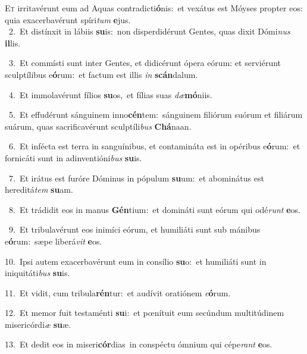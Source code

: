 \lettrine{\initial\textcolor{\initialcolor}{E}}{t} irritavérunt eum ad Aquas contradicti\-\textbf{ó}\-nis:~\star et vexátus est Móyses propter eos: quia exacerbavérunt spíri\textit{tum} \textbf{e}\-jus.\\
{\numbfont\textcolor{\numbcolor}{~2.}}~Et distínxit in lábiis \textbf{su}\-is:~\star non disperdidérunt Gentes, quas dixit Dómi\textit{nus} \textbf{il}\-lis.\par
{\numbfont\textcolor{\numbcolor}{~3.}}~Et commísti sunt inter Gentes, et didicérunt ópera eórum: et serviérunt sculptílibus e\-\textbf{ó}\-rum:~\star et factum est illis \textit{in} \textbf{scán}\-dalum.\par
{\numbfont\textcolor{\numbcolor}{~4.}}~Et immolavérunt fílios \textbf{su}\-os,~\star et fílias suas \textit{dæ}\-\textbf{mó}niis.\par
{\numbfont\textcolor{\numbcolor}{~5.}}~Et effudérunt sánguinem inno\-\textbf{cén}\-tem:~\star sánguinem filiórum suórum et filiárum suárum, quas sacrificavérunt sculptíli\textit{bus} \textbf{Chá}\-naan.\par
{\numbfont\textcolor{\numbcolor}{~6.}}~Et infécta est terra in sanguínibus, et contamináta est in opéribus e\-\textbf{ó}\-rum:~\star et fornicáti sunt in adinventióni\textit{bus} \textbf{su}\-is.\par
{\numbfont\textcolor{\numbcolor}{~7.}}~Et irátus est furóre Dóminus in pópulum \textbf{su}\-um:~\star et abominátus est hereditá\textit{tem} \textbf{su}\-am.\par
{\numbfont\textcolor{\numbcolor}{~8.}}~Et trádidit eos in manus \textbf{Gén}\-tium:~\star et domináti sunt eórum qui odé\textit{runt} \textbf{e}\-os.\par
{\numbfont\textcolor{\numbcolor}{~9.}}~Et tribulavérunt eos inimíci eórum, et humiliáti sunt sub mánibus e\-\textbf{ó}\-rum:~\star sæpe liberá\textit{vit} \textbf{e}\-os.\par
{\numbfont\textcolor{\numbcolor}{10.}}~Ipsi autem exacerbavérunt eum in consílio \textbf{su}\-o:~\star et humiliáti sunt in iniquitáti\textit{bus} \textbf{su}\-is.\par
{\numbfont\textcolor{\numbcolor}{11.}}~Et vidit, cum tribula\-\textbf{rén}\-tur:~\star et audívit oratiónem \textit{e}\-\textbf{ó}rum.\par
{\numbfont\textcolor{\numbcolor}{12.}}~Et memor fuit testaménti \textbf{su}\-i:~\star et pœnítuit eum secúndum multitúdinem misericórdi\textit{æ} \textbf{su}\-æ.\par
{\numbfont\textcolor{\numbcolor}{13.}}~Et dedit eos in miseri\-\textbf{cór}\-dias~\star in conspéctu ómnium qui cépe\textit{rant} \textbf{e}\-os.\par
